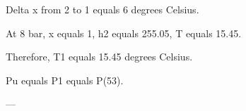 Delta x from 2 to 1 equals 6 degrees Celsius.  

At 8 bar, x equals 1, h2 equals 255.05, T equals 15.45.  

Therefore, T1 equals 15.45 degrees Celsius.  

Pu equals P1 equals P(53).  

---
